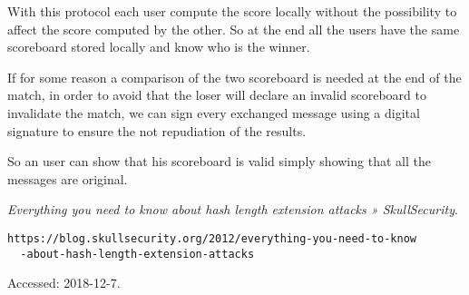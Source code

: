 \documentclass[11pt]{article}
\begin{document}
With this protocol each user compute the score locally without the possibility to affect the score computed by the other.
So at the end all the users have the same scoreboard stored locally and know who is the winner.

If for some reason a comparison of the two scoreboard is needed at the end of the match, in order to avoid that the loser will declare an invalid scoreboard to invalidate the match, we can sign every exchanged message using a digital signature to ensure the not repudiation of the results.

So an user can show that his scoreboard is valid simply showing that all the messages are original.

\vfill

\begin{thebibliography}{99}

{\em Everything you need to know about hash length extension attacks » SkullSecurity}.
  \begin{verbatim}https://blog.skullsecurity.org/2012/everything-you-need-to-know
  -about-hash-length-extension-attacks\end{verbatim}\newblock Accessed: 2018-12-7.

\end{thebibliography}
\end{document}
